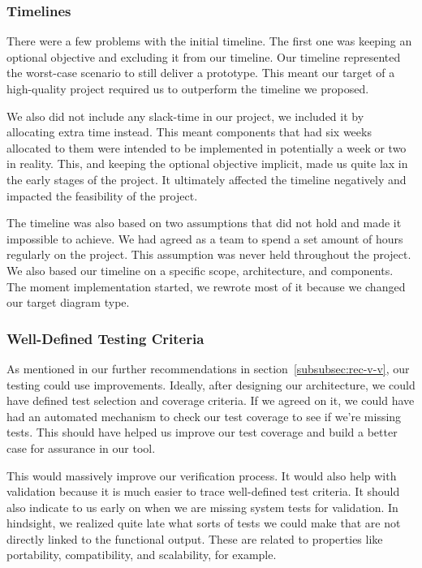 \subsubsection{Timelines}
There were a few problems with the initial timeline.
The first one was keeping an optional objective and excluding it from our timeline.
Our timeline represented the worst-case scenario to still deliver a prototype.
This meant our target of a high-quality project required us to outperform the timeline we proposed.

We also did not include any slack-time in our project, we included it by allocating extra time instead.
This meant components that had six weeks allocated to them were intended to be implemented in potentially a week or two in reality.
This, and keeping the optional objective implicit, made us quite lax in the early stages of the project.
It ultimately affected the timeline negatively and impacted the feasibility of the project.

The timeline was also based on two assumptions that did not hold and made it impossible to achieve.
We had agreed as a team to spend a set amount of hours regularly on the project.
This assumption was never held throughout the project.
We also based our timeline on a specific scope, architecture, and components.
The moment implementation started, we rewrote most of it because we changed our target diagram type.

\subsubsection{Well-Defined Testing Criteria}
As mentioned in our further recommendations in section~\ref{subsubsec:rec-v-v}, our testing could use improvements.
Ideally, after designing our architecture, we could have defined test selection and coverage criteria.
If we agreed on it, we could have had an automated mechanism to check our test coverage to see if we're missing tests.
This should have helped us improve our test coverage and build a better case for assurance in our tool.

This would massively improve our verification process.
It would also help with validation because it is much easier to trace well-defined test criteria.
It should also indicate to us early on when we are missing system tests for validation.
In hindsight, we realized quite late what sorts of tests we could make that are not directly linked to the functional output.
These are related to properties like portability, compatibility, and scalability, for example.